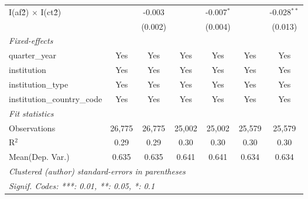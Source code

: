 \begin{tabular}{lcccccc}
   I(af\^2) $\times$ I(ct\^2)         &               & -0.003         &               & -0.007$^{*}$   &               & -0.028$^{**}$\\   
                                      &               & (0.002)        &               & (0.004)        &               & (0.013)\\   
   \midrule
   \emph{Fixed-effects}\\
   quarter\_year                      & Yes           & Yes            & Yes           & Yes            & Yes           & Yes\\  
   institution                        & Yes           & Yes            & Yes           & Yes            & Yes           & Yes\\  
   institution\_type                  & Yes           & Yes            & Yes           & Yes            & Yes           & Yes\\  
   institution\_country\_code         & Yes           & Yes            & Yes           & Yes            & Yes           & Yes\\  
   \midrule
   \emph{Fit statistics}\\
   Observations                       & 26,775        & 26,775         & 25,002        & 25,002         & 25,579        & 25,579\\  
   R$^2$                              & 0.29          & 0.29           & 0.30          & 0.30           & 0.30          & 0.30\\  
Mean(Dep. Var.) & 0.635 & 0.635 & 0.641 & 0.641 & 0.634 & 0.634 \\
   \midrule \midrule
   \multicolumn{7}{l}{\emph{Clustered (author) standard-errors in parentheses}}\\
   \multicolumn{7}{l}{\emph{Signif. Codes: ***: 0.01, **: 0.05, *: 0.1}}\\
\end{tabular}
\par\endgroup

